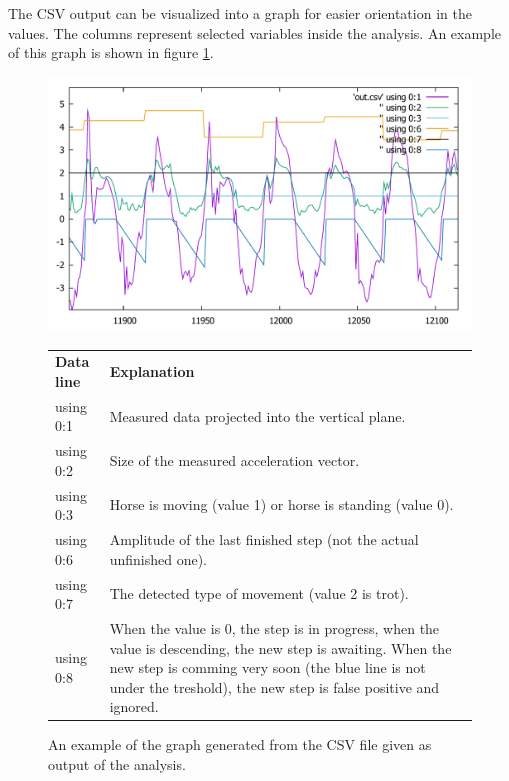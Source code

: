The \ac{CSV} output can be visualized into a graph for easier orientation in the values. The columns represent selected variables inside the analysis. An example of this graph is shown in figure \ref{fig:graphSelectedAnalysis}.

\begin{figure}[H]
	\centering
	\caption{An example of the graph generated from the CSV file given as output of the analysis.}
	\label{fig:graphSelectedAnalysis}
	\includegraphics[width=\linewidth]{img/outputHorseAnalysisZoom.pdf}
	\vspace{1cm}
	\begin{tabularx}{\linewidth}{lX}
		\textbf{Data line} & \textbf{Explanation}\\
		using 0:1 & Measured data projected into the vertical plane.\\
		using 0:2 & Size of the measured acceleration vector.\\
		using 0:3 & Horse is moving (value 1) or horse is standing (value 0).\\
		using 0:6 & Amplitude of the last finished step (not the actual unfinished one).\\
		using 0:7 & The detected type of movement (value 2 is trot).\\
		using 0:8 & When the value is 0, the step is in progress, when the value is descending, the new step is awaiting. When the new step is comming very soon (the blue line is not under the treshold), the new step is false positive and ignored.
	\end{tabularx}
\end{figure}
